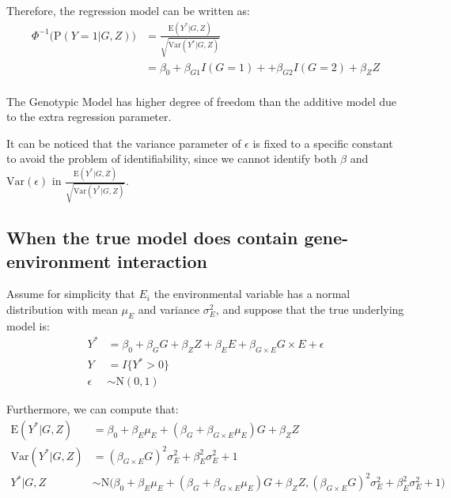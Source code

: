 \documentclass[
]{article}
\begin{document}
Therefore, the regression model can be written as:
\begin{equation}\label{eqn:probitModelLinearity2}
\begin{aligned}
\Phi^{-1}\bigg(\text{P}(Y=1|G,Z)\bigg) &= \frac{\text{E}(Y^* |G,Z)}{\sqrt{\text{Var}(Y^* |G,Z)}} \\
                                       &= \beta_0 +\beta_{G1} I(G = 1) + +\beta_{G2} I(G = 2) + \beta_Z Z \\
\end{aligned}
\end{equation}

The Genotypic Model has higher degree of freedom than the additive model
due to the extra regression parameter.

It can be noticed that the variance parameter of \(\epsilon\) is fixed
to a specific constant to avoid the problem of identifiability, since we
cannot identify both \(\beta\) and \(\text{Var}(\epsilon)\) in
\(\frac{\text{E}(Y^* |G,Z)}{\sqrt{\text{Var}(Y^* |G,Z)}}\).

\hypertarget{when-the-true-model-does-contain-gene-environment-interaction}{%
\subsection{When the true model does contain gene-environment
interaction}\label{when-the-true-model-does-contain-gene-environment-interaction}}

Assume for simplicity that \(E_i\) the environmental variable has a
normal distribution with mean \(\mu_E\) and variance \(\sigma_E^2\), and
suppose that the true underlying model is:
\begin{equation}\label{eqn:probitModelWithInteraction}
\begin{aligned}
Y^* &= \beta_0 + \beta_G G + \beta_Z Z + \beta_E E + \beta_{G\times E} G \times E + \epsilon \\
Y &= I\{Y^*>0\} \\
\epsilon &\sim \text{N}(0,1)
\end{aligned}
\end{equation}

Furthermore, we can compute that:
\begin{equation}\label{eqn:probitModelWithInteraction_MeanVar}
\begin{aligned}
\text{E}(Y^*|G,Z) &= \beta_0 + \beta_E \mu_E + (\beta_G + \beta_{G\times E} \mu_E)G + \beta_Z Z \\
\text{Var}(Y^*|G,Z) &= (\beta_{G\times E} G)^2 \sigma_E^2 + \beta_E^2 \sigma_E^2 + 1 \\
Y^*|G, Z &\sim \text{N}\bigg(\beta_0 + \beta_E \mu_E + (\beta_G + \beta_{G\times E} \mu_E)G + \beta_Z Z, (\beta_{G\times E} G)^2 \sigma_E^2 + \beta_E^2 \sigma_E^2 + 1 \bigg)
\end{aligned}
\end{equation}
\end{document}
